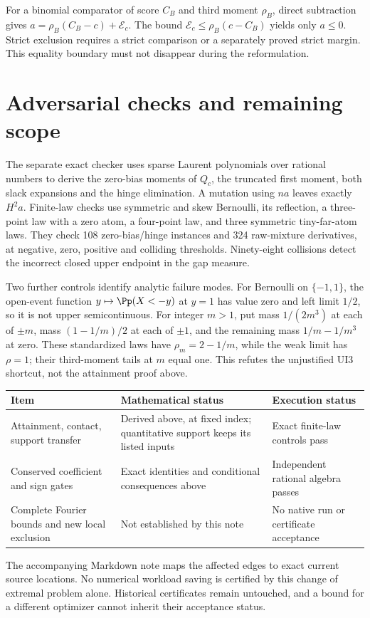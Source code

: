For a binomial comparator of score $C_B$ and third moment $\rho_B$,
direct subtraction gives
$a=\rho_B(C_B-c)+\mathcal E_c$. The bound
$\mathcal E_c\le\rho_B(c-C_B)$ yields only $a\le0$.
Strict exclusion requires a strict comparison or a separately proved
strict margin. This equality boundary must not disappear during the
reformulation.

\section{Adversarial checks and remaining scope}
The separate exact checker uses sparse Laurent polynomials over rational
numbers to derive the zero-bias moments of $Q_c$, the truncated first
moment, both slack expansions and the hinge elimination. A mutation
using $na$ leaves exactly $H^2a$. Finite-law checks use symmetric and
skew Bernoulli, its reflection, a three-point law with a zero atom, a
four-point law, and three symmetric tiny-far-atom laws. They check 108
zero-bias/hinge instances and 324 raw-mixture derivatives, at negative,
zero, positive and colliding thresholds. Ninety-eight collisions detect
the incorrect closed upper endpoint in the gap measure.

Two further controls identify analytic failure modes. For Bernoulli on
$\{-1,1\}$, the open-event function
$y\mapsto\Pp(X<-y)$ at $y=1$ has value zero and left limit $1/2$, so it
is not upper semicontinuous. For integer $m>1$, put mass $1/(2m^3)$ at
each of $\pm m$, mass $(1-1/m)/2$ at each of $\pm1$, and the remaining
mass $1/m-1/m^3$ at zero. These standardized laws have
$\rho_m=2-1/m$, while the weak limit has $\rho=1$; their third-moment
tails at $m$ equal one. This refutes the unjustified UI3 shortcut, not
the attainment proof above.

\begin{center}
\begin{tabular}{p{43mm}p{48mm}p{49mm}}
\toprule
Item & Mathematical status & Execution status\\
\midrule
Attainment, contact, support transfer & Derived above, at fixed index;
quantitative support keeps its listed inputs & Exact finite-law controls pass\\
Conserved coefficient and sign gates & Exact identities and conditional
consequences above & Independent rational algebra passes\\
Complete Fourier bounds and new local exclusion & Not established by this
note & No native run or certificate acceptance\\
\bottomrule
\end{tabular}
\end{center}
The accompanying Markdown note maps the affected edges to exact current
source locations. No numerical workload saving is certified by this
change of extremal problem alone. Historical certificates remain
untouched, and a bound for a different optimizer cannot inherit their
acceptance status.
